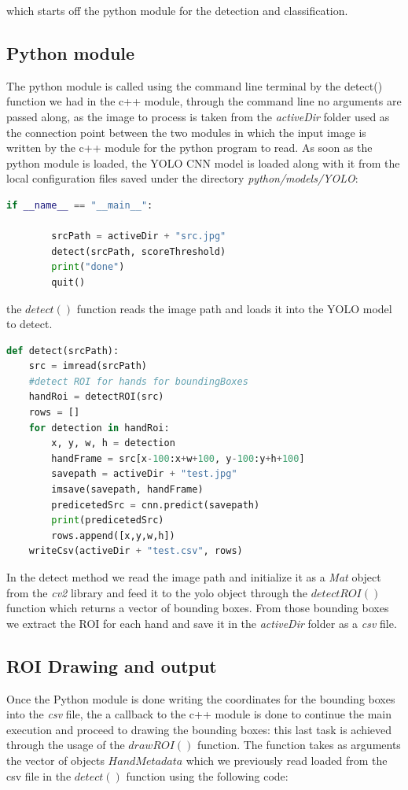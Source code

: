 which starts off the python module for the detection and classification.

\subsection{Python module}
The python module is called using the command line terminal by the detect()
function we had in the c++ module, through the command line no arguments are
passed along,
as the image to process is taken from the \textit{activeDir} folder used as the
connection point between the two modules in which the input image is written by
the
c++ module for the python program to read. As soon as the python module is
loaded, the YOLO CNN model is loaded along with it from the local configuration
files
saved under the directory \textit{python/models/YOLO}:

\begin{lstlisting}[language=python]
    if __name__ == "__main__":

        srcPath = activeDir + "src.jpg"
        detect(srcPath, scoreThreshold)
        print("done")
        quit()
\end{lstlisting}

the $detect()$ function reads the image path and loads it into the YOLO model
to detect.

\begin{lstlisting}[language=python]
    def detect(srcPath):
    src = imread(srcPath)
    #detect ROI for hands for boundingBoxes
    handRoi = detectROI(src)
    rows = []
    for detection in handRoi:
        x, y, w, h = detection
        handFrame = src[x-100:x+w+100, y-100:y+h+100]
        savepath = activeDir + "test.jpg"
        imsave(savepath, handFrame)
        predicetedSrc = cnn.predict(savepath)
        print(predicetedSrc)
        rows.append([x,y,w,h])
    writeCsv(activeDir + "test.csv", rows)
\end{lstlisting}

In the detect method we read the image path and initialize it as a \textit{Mat}
object from the \textit{cv2} library and feed it to the
yolo object through the $detectROI()$ function which returns a vector of
bounding boxes. From those bounding boxes we extract the ROI for each hand and
save it in the
\textit{activeDir} folder as a \textit{csv} file.

\subsection{ROI Drawing and output}
Once the Python module is done writing the coordinates for the bounding boxes
into the \textit{csv} file,
the a callback to the c++ module is done to continue the main execution and
proceed to drawing the bounding boxes:
this last task is achieved through the usage of the $drawROI()$ function. The
function takes as arguments the vector of objects $HandMetadata$ which we
previously
read loaded from the csv file in the $detect()$ function using the following
code:

